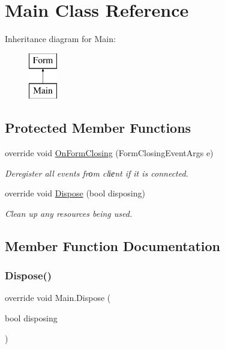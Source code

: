 \hypertarget{class_main}{}\section{Main Class Reference}
\label{class_main}
Inheritance diagram for Main\+:\begin{figure}[H]
\begin{center}
\leavevmode
\includegraphics[height=2.000000cm]{class_main}
\end{center}
\end{figure}
\subsection*{Protected Member Functions}
\begin{DoxyCompactItemize}
\item 
override void \hyperlink{class_main_a2781568ca7b680057a104733425d4f60}{On\+Form\+Closing} (Form\+Closing\+Event\+Args e)
\begin{DoxyCompactList}\small\item\em Deregister all events frоm clіеnt if it is connected. \end{DoxyCompactList}\item 
override void \hyperlink{class_main_a6f7ab0dc855ae93f03346df603b45acb}{Dispose} (bool disposing)
\begin{DoxyCompactList}\small\item\em Clean up any resources being used. \end{DoxyCompactList}\end{DoxyCompactItemize}


\subsection{Member Function Documentation}
\mbox{\label{class_main_a6f7ab0dc855ae93f03346df603b45acb}} 
\subsubsection{\texorpdfstring{Dispose()}{Dispose()}}
{\footnotesize\ttfamily override void Main.\+Dispose (\begin{DoxyParamCaption}\item[{bool}]{disposing }\end{DoxyParamCaption})\hspace{0.3cm}{\ttfamily [protected]}}



